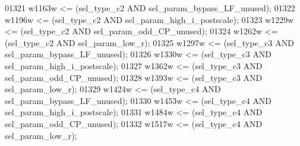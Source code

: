 \begin{DoxyCode}
{01321     \textcolor{vhdlchar}{w1163w} \textcolor{vhdlchar}{<=} \textcolor{vhdlchar}{(}\textcolor{vhdlchar}{sel_type_c2} \textcolor{keywordflow}{AND} \textcolor{vhdlchar}{sel_param_bypass_LF_unused}\textcolor{vhdlchar}{)};
01322     \textcolor{vhdlchar}{w1196w} \textcolor{vhdlchar}{<=} \textcolor{vhdlchar}{(}\textcolor{vhdlchar}{sel_type_c2} \textcolor{keywordflow}{AND} \textcolor{vhdlchar}{sel_param_high_i_postscale}\textcolor{vhdlchar}{)};
01323     \textcolor{vhdlchar}{w1229w} \textcolor{vhdlchar}{<=} \textcolor{vhdlchar}{(}\textcolor{vhdlchar}{sel_type_c2} \textcolor{keywordflow}{AND} \textcolor{vhdlchar}{sel_param_odd_CP_unused}\textcolor{vhdlchar}{)};
01324     \textcolor{vhdlchar}{w1262w} \textcolor{vhdlchar}{<=} \textcolor{vhdlchar}{(}\textcolor{vhdlchar}{sel_type_c2} \textcolor{keywordflow}{AND} \textcolor{vhdlchar}{sel_param_low_r}\textcolor{vhdlchar}{)};
01325     \textcolor{vhdlchar}{w1297w} \textcolor{vhdlchar}{<=} \textcolor{vhdlchar}{(}\textcolor{vhdlchar}{sel_type_c3} \textcolor{keywordflow}{AND} \textcolor{vhdlchar}{sel_param_bypass_LF_unused}\textcolor{vhdlchar}{)};
01326     \textcolor{vhdlchar}{w1330w} \textcolor{vhdlchar}{<=} \textcolor{vhdlchar}{(}\textcolor{vhdlchar}{sel_type_c3} \textcolor{keywordflow}{AND} \textcolor{vhdlchar}{sel_param_high_i_postscale}\textcolor{vhdlchar}{)};
01327     \textcolor{vhdlchar}{w1362w} \textcolor{vhdlchar}{<=} \textcolor{vhdlchar}{(}\textcolor{vhdlchar}{sel_type_c3} \textcolor{keywordflow}{AND} \textcolor{vhdlchar}{sel_param_odd_CP_unused}\textcolor{vhdlchar}{)};
01328     \textcolor{vhdlchar}{w1393w} \textcolor{vhdlchar}{<=} \textcolor{vhdlchar}{(}\textcolor{vhdlchar}{sel_type_c3} \textcolor{keywordflow}{AND} \textcolor{vhdlchar}{sel_param_low_r}\textcolor{vhdlchar}{)};
01329     \textcolor{vhdlchar}{w1424w} \textcolor{vhdlchar}{<=} \textcolor{vhdlchar}{(}\textcolor{vhdlchar}{sel_type_c4} \textcolor{keywordflow}{AND} \textcolor{vhdlchar}{sel_param_bypass_LF_unused}\textcolor{vhdlchar}{)};
01330     \textcolor{vhdlchar}{w1453w} \textcolor{vhdlchar}{<=} \textcolor{vhdlchar}{(}\textcolor{vhdlchar}{sel_type_c4} \textcolor{keywordflow}{AND} \textcolor{vhdlchar}{sel_param_high_i_postscale}\textcolor{vhdlchar}{)};
01331     \textcolor{vhdlchar}{w1484w} \textcolor{vhdlchar}{<=} \textcolor{vhdlchar}{(}\textcolor{vhdlchar}{sel_type_c4} \textcolor{keywordflow}{AND} \textcolor{vhdlchar}{sel_param_odd_CP_unused}\textcolor{vhdlchar}{)};
01332     \textcolor{vhdlchar}{w1517w} \textcolor{vhdlchar}{<=} \textcolor{vhdlchar}{(}\textcolor{vhdlchar}{sel_type_c4} \textcolor{keywordflow}{AND} \textcolor{vhdlchar}{sel_param_low_r}\textcolor{vhdlchar}{)};
}
\end{DoxyCode}
